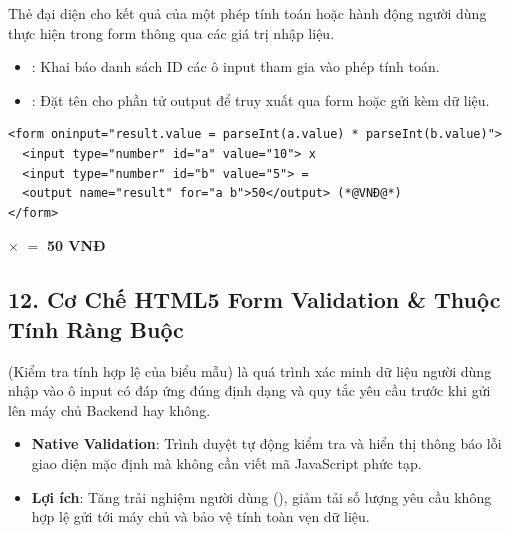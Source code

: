 Thẻ  đại diện cho kết quả của một phép tính toán hoặc hành động người dùng thực hiện trong form thông qua các giá trị nhập liệu.

\begin{conceptBox}
\begin{itemize}[leftmargin=1.5em, itemsep=3pt, parsep=0pt]
    \item {}: Khai báo danh sách ID các ô input tham gia vào phép tính toán.
    \item {}: Đặt tên cho phần tử output để truy xuất qua form hoặc gửi kèm dữ liệu.
\end{itemize}
\end{conceptBox}

\begin{codeWindow}
\begin{lstlisting}[language=HTML5]
<form oninput="result.value = parseInt(a.value) * parseInt(b.value)">
  <input type="number" id="a" value="10"> x
  <input type="number" id="b" value="5"> =
  <output name="result" for="a b">50</output> (*@VNĐ@*)
</form>
\end{lstlisting}
\end{codeWindow}

\begin{browserWindow}
\sffamily\small
\begin{center}
 $\times$  $=$ \textcolor{green!60!black}{\textbf{50 VNĐ}}
\end{center}
\end{browserWindow}

\subsection{12. Cơ Chế HTML5 Form Validation \& Thuộc Tính Ràng Buộc}
\label{sec:form_validation_attributes}

\begin{conceptBox}
 (Kiểm tra tính hợp lệ của biểu mẫu) là quá trình xác minh dữ liệu người dùng nhập vào ô input có đáp ứng đúng định dạng và quy tắc yêu cầu trước khi gửi lên máy chủ Backend hay không.
\begin{itemize}[leftmargin=1.5em, itemsep=2pt, parsep=0pt]
    \item \textbf{Native Validation}: Trình duyệt tự động kiểm tra và hiển thị thông báo lỗi giao diện mặc định mà không cần viết mã JavaScript phức tạp.
    \item \textbf{Lợi ích}: Tăng trải nghiệm người dùng (), giảm tải số lượng yêu cầu không hợp lệ gửi tới máy chủ và bảo vệ tính toàn vẹn dữ liệu.
\end{itemize}
\end{conceptBox}

